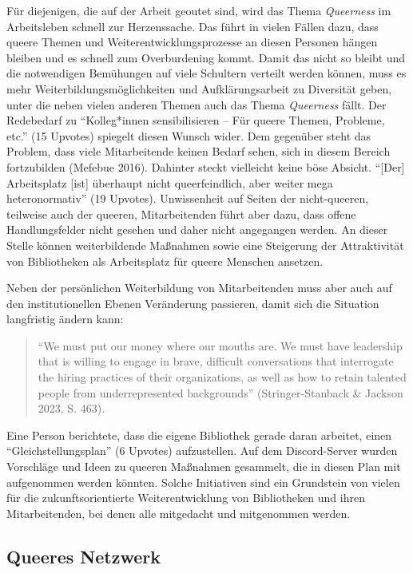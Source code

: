 \documentclass[a4paper,
fontsize=11pt,
oneside,
numbers=noperiodatend,
parskip=half-,
bibliography=totoc,
final
]{scrartcl}
\begin{document}
Für diejenigen, die auf der Arbeit geoutet sind, wird das Thema
\emph{Queerness} im Arbeitsleben schnell zur Herzenssache. Das führt in
vielen Fällen dazu, dass queere Themen und Weiterentwicklungsprozesse an
diesen Personen hängen bleiben und es schnell zum Overburdening kommt.
Damit das nicht so bleibt und die notwendigen Bemühungen auf viele
Schultern verteilt werden können, muss es mehr
Weiterbildungsmöglichkeiten und Aufklärungsarbeit zu Diversität geben,
unter die neben vielen anderen Themen auch das Thema \emph{Queerness}
fällt. Der Redebedarf zu \enquote{Kolleg*innen sensibilisieren -- Für
queere Themen, Probleme, etc.} (15 Upvotes) spiegelt diesen Wunsch
wider. Dem gegenüber steht das Problem, dass viele Mitarbeitende keinen
Bedarf sehen, sich in diesem Bereich fortzubilden (Mefebue 2016).
Dahinter steckt vielleicht keine böse Absicht. \enquote{{[}Der{]}
Arbeitsplatz {[}ist{]} überhaupt nicht queerfeindlich, aber weiter mega
heteronormativ} (19 Upvotes). Unwissenheit auf Seiten der nicht-queeren,
teilweise auch der queeren, Mitarbeitenden führt aber dazu, dass offene
Handlungsfelder nicht gesehen und daher nicht angegangen werden. An
dieser Stelle können weiterbildende Maßnahmen sowie eine Steigerung der
Attraktivität von Bibliotheken als Arbeitsplatz für queere Menschen
ansetzen.

Neben der persönlichen Weiterbildung von Mitarbeitenden muss aber auch
auf den institutionellen Ebenen Veränderung passieren, damit sich die
Situation langfristig ändern kann:

\begin{quote}
\enquote{We must put our money where our mouths are. We must have
leadership that is willing to engage in brave, difficult conversations
that interrogate the hiring practices of their organizations, as well as
how to retain talented people from underrepresented backgrounds}
(Stringer-Stanback \& Jackson 2023, S. 463).
\end{quote}

Eine Person berichtete, dass die eigene Bibliothek gerade daran
arbeitet, einen \enquote{Gleichstellungsplan} (6 Upvotes) aufzustellen.
Auf dem Discord-Server wurden Vorschläge und Ideen zu queeren Maßnahmen
gesammelt, die in diesen Plan mit aufgenommen werden könnten. Solche
Initiativen sind ein Grundstein von vielen für die zukunftsorientierte
Weiterentwicklung von Bibliotheken und ihren Mitarbeitenden, bei denen
alle mitgedacht und mitgenommen werden.

\subsection{Queeres Netzwerk}\label{queeres-netzwerk}
\end{document}
